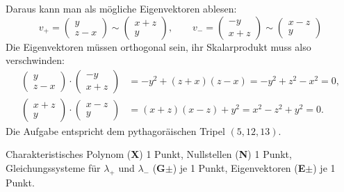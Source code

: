 \begin{diskussion}
\[\]
Daraus kann man als mögliche Eigenvektoren ablesen:
\[
v_+=\begin{pmatrix}
y\\z-x
\end{pmatrix}
\sim
\begin{pmatrix}
x+z\\y
\end{pmatrix}
,\qquad
v_-=\begin{pmatrix}
-y\\x+z
\end{pmatrix}
\sim
\begin{pmatrix}
x-z\\y
\end{pmatrix}
\]
Die Eigenvektoren müssen orthogonal sein, ihr Skalarprodukt muss also
verschwinden:
\begin{align*}
\begin{pmatrix}
y\\z-x
\end{pmatrix}
\cdot
\begin{pmatrix}
-y\\x+z
\end{pmatrix}
&=
-y^2+(z+x)(z-x)=-y^2+z^2-x^2=0,
\\
\begin{pmatrix}
x+z\\y
\end{pmatrix}
\cdot
\begin{pmatrix}
x-z\\y
\end{pmatrix}
&=
(x+z)(x-z)+y^2=x^2-z^2+y^2=0.
\end{align*}
Die Aufgabe entspricht dem pythagoräischen Tripel $(5,12,13)$.
\end{diskussion}

\begin{bewertung}
Charakteristisches Polynom ({\bf X}) 1 Punkt,
Nullstellen ({\bf N}) 1 Punkt,
Gleichungssysteme für $\lambda_+$ und $\lambda_-$ ({\bf G$\pm$}) je 1 Punkt,
Eigenvektoren ({\bf E$\pm$}) je 1 Punkt.
\end{bewertung}

